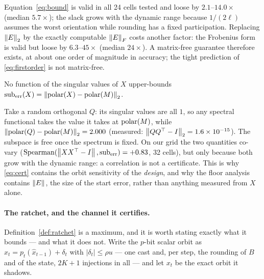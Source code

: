 Equation~\eqref{eq:bound} is valid in all 24 cells tested and loose by
$2.1$--$14.0\times$ (median $5.7\times$); the slack grows with the dynamic range
because $1/(2\ell)$ assumes the worst orientation while rounding has a fixed
participation.  Replacing $\left\lVert E \right\rVert_2$ by the exactly computable $\left\lVert E \right\rVert_F$ costs
another factor: the Frobenius form is valid but loose by $6.3$--$45\times$ (median
$24\times$).  A matrix-free guarantee therefore exists, at about one order of
magnitude in accuracy; the tight prediction of \eqref{eq:firstorder} is not
matrix-free.

\begin{proposition}
\label{prop:nospectral}
No function of the singular values of $X$ upper-bounds
$\mathrm{sub}_{\mathrm{err}}(X) = \left\lVert \operatorname{polar}(X)-\operatorname{polar}(M) \right\rVert_2$.
\end{proposition}

Take a random orthogonal $Q$: its singular values are all $1$, so any spectral
functional takes the value it takes at $\operatorname{polar}(M)$, while
$\left\lVert \operatorname{polar}(Q)-\operatorname{polar}(M) \right\rVert_2 = 2.000$ (measured: $\left\lVert QQ^\top-I \right\rVert_2 =
1.6\times10^{-15}$).  The subspace is free once the spectrum is fixed.  On our grid
the two quantities co-vary ($\mathrm{Spearman}(\left\lVert XX^\top-I \right\rVert,
\mathrm{sub}_{\mathrm{err}}) = +0.83$, 32 cells), but only because both grow with
the dynamic range: a correlation is not a certificate.  This is why
\eqref{eq:cert} contains the orbit sensitivity of the \emph{design}, and why the
floor analysis contains $\left\lVert E \right\rVert$, the size of the start error, rather than
anything measured from $X$ alone.

\paragraph{The ratchet, and the channel it certifies.}
Definition~\ref{def:ratchet} is a maximum, and it is worth stating exactly what it
bounds --- and what it does not.  Write the $p$-bit scalar orbit as
$\hat x_t = p_t(\hat x_{t-1}) + \delta_t$ with
$|\delta_t|\le\rho u$ --- one cast and, per step, the rounding of $B$ and of the state,
$2K+1$ injections in all --- and let $x_t$ be the exact orbit it shadows.

